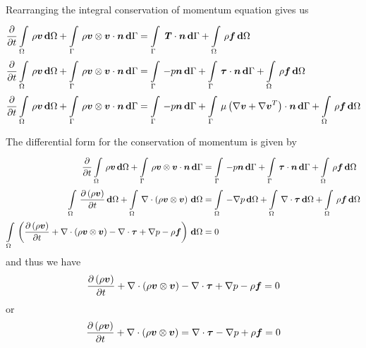 Rearranging the integral conservation of momentum equation gives us
\begin{equation}
  \begin{split}
    \delby{}{t}\gint{\Omega}{}{\rho\vectr{v}}{\Omega}+\gint{\Gamma}{}{\dotprod{\tensorprod{\rho\vectr{v}}{\vectr{v}}}{\vectr{n}}}{\Gamma}
    &=\gint{\Gamma}{}{\dotprod{\tensor{T}}{\vectr{n}}}{\Gamma}+\gint{\Omega}{}{\rho\vectr{f}}{\Omega}\\
    \delby{}{t}\gint{\Omega}{}{\rho\vectr{v}}{\Omega}+\gint{\Gamma}{}{\dotprod{\tensorprod{\rho\vectr{v}}{\vectr{v}}}{\vectr{n}}}{\Gamma}
    &=\gint{\Gamma}{}{-p\vectr{n}}{\Gamma}+\gint{\Gamma}{}{\dotprod{\tensor{\tau}}{\vectr{n}}}{\Gamma}+\gint{\Omega}{}{\rho\vectr{f}}{\Omega} \\
    \delby{}{t}\gint{\Omega}{}{\rho\vectr{v}}{\Omega}+\gint{\Gamma}{}{\dotprod{\tensorprod{\rho\vectr{v}}{\vectr{v}}}{\vectr{n}}}{\Gamma}
    &=\gint{\Gamma}{}{-p\vectr{n}}{\Gamma}+\gint{\Gamma}{}{\dotprod{\mu\pbrac{\gradient{}{\vectr{v}}+\transpose{\gradient{}{\vectr{v}}}}}{\vectr{n}}}{\Gamma}+\gint{\Omega}{}{\rho\vectr{f}}{\Omega} \\
  \end{split}
  \label{eqn:integralconservationofmomentum}
\end{equation}

The differential form for the conservation of momentum is given by
\begin{equation}
  \begin{split}
    \delby{}{t}\gint{\Omega}{}{\rho\vectr{v}}{\Omega}+\gint{\Gamma}{}{\dotprod{\tensorprod{\rho\vectr{v}}{\vectr{v}}}{\vectr{n}}}{\Gamma}
    &=\gint{\Gamma}{}{-p\vectr{n}}{\Gamma}+\gint{\Gamma}{}{\dotprod{\tensor{\tau}}{\vectr{n}}}{\Gamma}
    +\gint{\Omega}{}{\rho\vectr{f}}{\Omega} \\
    \gint{\Omega}{}{\delby{\pbrac{\rho\vectr{v}}}{t}}{\Omega}
    +\gint{\Omega}{}{\divergence{}{\pbrac{\tensorprod{\rho\vectr{v}}{\vectr{v}}}}}{\Omega}
    &=\gint{\Omega}{}{-\gradient{}{p}}{\Omega}+\gint{\Omega}{}{\divergence{}{\tensor{\tau}}}{\Omega}
    +\gint{\Omega}{}{\rho\vectr{f}}{\Omega}\\
    \gint{\Omega}{}{\pbrac{\delby{\pbrac{\rho\vectr{v}}}{t}+\divergence{}{\pbrac{\tensorprod{\rho\vectr{v}}{\vectr{v}}}}-\divergence{}{\tensor{\tau}}+\gradient{}{p}-\rho\vectr{f}}}{\Omega}&=0
  \end{split}
\end{equation}
and thus we have
\begin{equation}
  \delby{\pbrac{\rho\vectr{v}}}{t}+\divergence{}{\pbrac{\tensorprod{\rho\vectr{v}}{\vectr{v}}}}-\divergence{}{\tensor{\tau}}+\gradient{}{p}-\rho\vectr{f}=0
\end{equation}
or
\begin{equation}
  \delby{\pbrac{\rho\vectr{v}}}{t}+\divergence{}{\pbrac{\tensorprod{\rho\vectr{v}}{\vectr{v}}}}=\divergence{}{\tensor{\tau}}-\gradient{}{p}+\rho\vectr{f}=0
  \label{eqn:differentialconservationofmomentum}
\end{equation}

